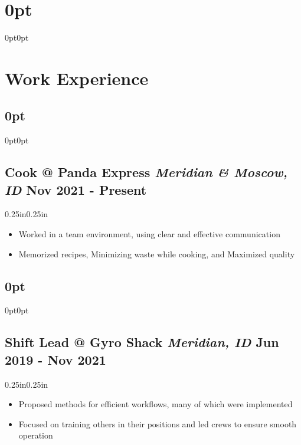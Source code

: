 \documentclass[12pt]{article}
\newcommand{\medium}[1]{
  {\futuramedium#1}
}
\newcommand{\topic}[2]{
  \titlespacing*\section{0pt}{0pt}{0pt}
  \titleformat{\section}[block]{\Large}{}{1em}{}
  \section*{\textbf{#1}}
  \begin{adjustwidth}{}{}
    #2
  \end{adjustwidth}
}
\newcommand{\entry}[4]{
  \titlespacing*\subsection{0pt}{0pt}{0pt}
  \titleformat{\subsection}[block]{\normalfont}{}{1em}{}
  \subsection*{\medium{#1} \textit{\footnotesize#2} \hfill #3} 
  \begin{adjustwidth}{0.25in}{0.25in}
    #4
  \end{adjustwidth}
}
\begin{document}
  \topic{Work Experience} {
    \entry{Cook @ Panda Express}{Meridian \& Moscow, ID}{Nov 2021 - Present}{
      \begin{itemize}
        \item Worked in a team environment, using clear and effective communication
        \item Memorized recipes, Minimizing waste while cooking, and Maximized quality
      \end{itemize}
    }
    \entry{Shift Lead @ Gyro Shack}{Meridian, ID}{Jun 2019 - Nov 2021}{
      \begin{itemize}
        \item Proposed methods for efficient workflows, many of which were implemented
        \item Focused on training others in their positions and led crews to ensure smooth operation
      \end{itemize}
    }

    \thispagestyle{empty} 
  }
\end{document}
